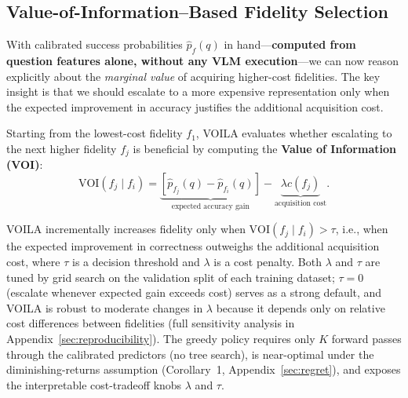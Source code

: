 \subsection{Value-of-Information--Based Fidelity Selection}
\label{sec:voi}

With calibrated success probabilities $\hat{p}_f(q)$ in hand---\textbf{computed from question features alone, without any VLM execution}---we can now reason explicitly about the \emph{marginal value} of acquiring higher-cost fidelities. The key insight is that we should escalate to a more expensive representation only when the expected improvement in accuracy justifies the additional acquisition cost.

Starting from the lowest-cost fidelity $f_1$, VOILA evaluates whether escalating to the next higher fidelity $f_j$ is beneficial by computing the \textbf{Value of Information (VOI)}:
\[
\mathrm{VOI}(f_j \mid f_i)
=
\underbrace{[\hat{p}_{f_j}(q) - \hat{p}_{f_i}(q)]}_{\text{expected accuracy gain}} - \underbrace{\lambda c(f_j)}_{\text{acquisition cost}}.
\]

\textsc{VOILA} incrementally increases fidelity only when $\mathrm{VOI}(f_j \mid f_i) > \tau$, i.e., when the expected improvement in correctness outweighs the additional acquisition cost, where $\tau$ is a decision threshold and $\lambda$ is a cost penalty.
Both $\lambda$ and $\tau$ are tuned by grid search on the validation split of each training dataset; $\tau = 0$ (escalate whenever expected gain exceeds cost) serves as a strong default, and \textsc{VOILA} is robust to moderate changes in $\lambda$ because it depends only on relative cost differences between fidelities (full sensitivity analysis in Appendix~\ref{sec:reproducibility}).
The greedy policy requires only $K$ forward passes through the calibrated predictors (no tree search), is near-optimal under the diminishing-returns assumption (Corollary~1, Appendix~\ref{sec:regret}), and exposes the interpretable cost-tradeoff knobs $\lambda$ and $\tau$.


